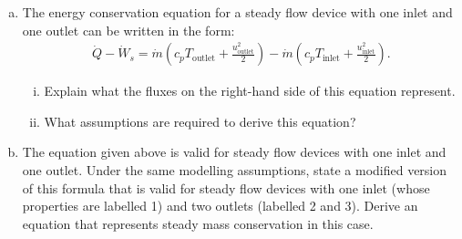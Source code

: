 \documentclass[calculator,steamtables,refrigeranttables,psychrometricchart,datasheet,solutions]{exam}
\begin{document}
\begin{question}
\begin{enumerate}[(a)]
\end{enumerate}

%
\end{question}

\clearpage


\begin{question} 
\begin{enumerate}[(a)]
\item The energy conservation equation for a steady flow device with one inlet and one outlet can be written in the form:
\begin{align*}
 \dot{Q}-\dot{W}_{s} = \dot{m} \left(c_p T_\text{outlet} + \frac{u_{\text{outlet}}^2}{2}\right) - \dot{m} \left(c_p T_\text{inlet} + \frac{u_{\text{inlet}}^2}{2}\right).
\end{align*}
\begin{enumerate}[(i)]
\item Explain what the fluxes on the right-hand side of this equation represent. 
\item What assumptions are required to derive this equation? 
\end{enumerate}

\item The equation given above is valid for steady flow devices with one inlet and one outlet. Under the same modelling assumptions, state a modified version of this formula that is valid for steady flow devices with one inlet (whose properties are labelled 1) and two outlets (labelled 2 and 3). Derive an equation that represents steady mass conservation in this case. 
\end{enumerate}
\end{question}
\end{document}
